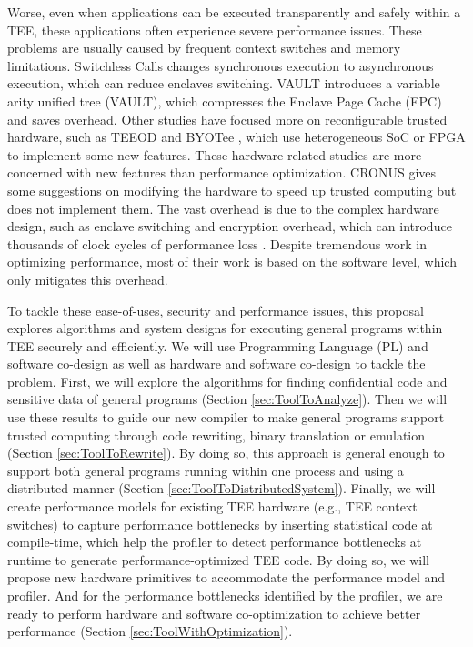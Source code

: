 Worse, even when applications can be executed transparently and safely within a TEE,
these applications often experience severe performance issues.
These problems are usually caused by frequent context switches and memory limitations.
Switchless Calls \cite{Tian2018SwitchlessCM} changes synchronous execution
to asynchronous execution, which can reduce enclaves switching.
VAULT \cite{Taassori2018VAULTRP} introduces a variable arity unified tree (VAULT),
which compresses the Enclave Page Cache (EPC) and saves overhead.
Other studies have focused more on reconfigurable trusted hardware,
such as TEEOD \cite{Pereira2021TowardsAT} and BYOTee \cite{Armanuzzaman2022BYOTeeTB},
which use heterogeneous SoC or FPGA to implement some new features.
These hardware-related studies are more concerned with new features than
performance optimization. CRONUS \cite{Jiang2022CRONUSFS} gives some suggestions
on modifying the hardware to speed up trusted computing but does not
implement them.
The vast overhead is due to the complex hardware design, such as enclave switching
and encryption overhead, which can introduce thousands of clock cycles of performance
loss \cite{Weichbrodt2018sgxperfAP}. 
Despite tremendous work in optimizing performance, most of their work is based on the
software level, which only mitigates this overhead.

To tackle these ease-of-uses, security and performance issues, this proposal explores
algorithms and system designs for executing general programs within TEE securely and efficiently.
We will use Programming Language (PL) and software co-design as well as hardware and software co-design
to tackle the problem.
First, we will explore the algorithms for finding confidential code and sensitive data of
general programs (Section \ref{sec:ToolToAnalyze}). Then we will use these results
to guide our new compiler to make general programs support trusted computing through
code rewriting, binary translation or emulation (Section \ref{sec:ToolToRewrite}).
By doing so, this approach is general enough to support both general programs running within
one process and using a distributed manner (Section \ref{sec:ToolToDistributedSystem}).
Finally, we will create performance models for existing TEE hardware (e.g., TEE context switches)
to capture performance bottlenecks by inserting statistical code at compile-time,
which help the profiler to detect performance bottlenecks at runtime to generate
performance-optimized TEE code. By doing so, we will propose new hardware primitives
to accommodate the performance model and profiler.
And for the performance bottlenecks identified by the profiler, we are ready to
perform hardware and software co-optimization to achieve better performance
(Section \ref{sec:ToolWithOptimization}).
